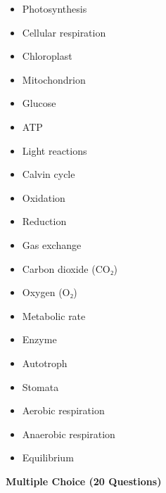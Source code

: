 \documentclass[
  letterpaper,
  DIV=11,
  numbers=noendperiod]{scrreprt}
\begin{document}
\begin{itemize}
\item
  Photosynthesis
\item
  Cellular respiration
\item
  Chloroplast
\item
  Mitochondrion
\item
  Glucose
\item
  ATP
\item
  Light reactions
\item
  Calvin cycle
\item
  Oxidation
\item
  Reduction
\item
  Gas exchange
\item
  Carbon dioxide (CO₂)
\item
  Oxygen (O₂)
\item
  Metabolic rate
\item
  Enzyme
\item
  Autotroph
\item
  Stomata
\item
  Aerobic respiration
\item
  Anaerobic respiration
\item
  Equilibrium
\end{itemize}

\textbf{Multiple Choice (20 Questions)}
\end{document}
